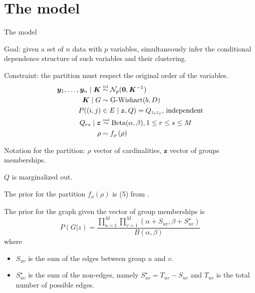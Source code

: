 
\section{The model}

\begin{frame}{The model}

\alert{Goal}: given a set of $n$ data with $p$ variables, simultaneously infer the conditional dependence structure of such variables and their clustering.

\pause

\alert{Constraint}: the partition must respect the original order of the variables.
\pause
\begin{align*}
    \bm{y}_1, \ldots, \bm{y}_n \mid \bm{K} & \overset{\text{\tiny{iid}}}{\sim} \mathcal{N}_p(\mathbf{0}, \bm{K}^{-1} ) \\
    \bm{K} \mid G & \sim \operatorname{G-Wishart}(b, D)\\
    P((i,j)&\in E\mid \bm{z},Q) = Q_{z_{i} z_{j}},\,\text{independent}\\
        Q_{rs} \mid \bm{z} &\overset{\text{\tiny{ind}}}{\sim} \operatorname{Beta}(\alpha,\beta), 1\leq r\leq s\leq M\\
    \rho & \sim f_{\rho} \left(\rho\right)
\end{align*}

Notation for the partition: $\rho$ vector of cardinalities, $\bm{z}$ vector of groups memberships.

\end{frame}

\begin{frame}

$Q$ is marginalized out.
\pause

The prior for the \alert{partition} $f_{\rho}(\rho)$ is (5) from \cite{martinezNonparametricChangePoint2014}.

The prior for the \alert{graph} given the vector of group memberships is
$$P(G|z)= \frac {\prod_{u=1}^{M}\prod_{v=1}^{M}(\alpha + S_{uv}, \beta+ S^{\star}_{uv})}{B(\alpha,\beta)}$$
where 
\begin{itemize}
    \item $S_{uv}$ is the sum of the edges between group $u$ and $v$.
    \item $S^{\star}_{uv}$ is the sum of the non-edges, namely $S^{\star}_{uv} = T_{uv} - S_{uv}$ and $T_{uv}$ is the total number of possible edges.
\end{itemize}
\pause


\end{frame}


